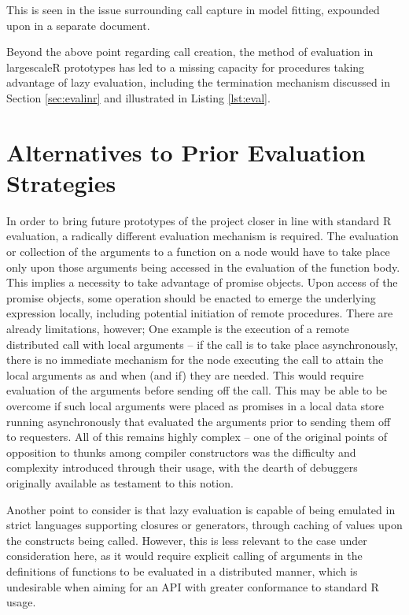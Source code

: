 \documentclass[10pt,a4paper]{article}
\begin{document}
This is seen in the issue surrounding call capture in model fitting, expounded upon in a separate document.

Beyond the above point regarding call creation, the method of evaluation in largescaleR prototypes has led to a missing capacity for procedures taking advantage of lazy evaluation, including the termination mechanism discussed in Section \ref{sec:evalinr} and illustrated in Listing \ref{lst:eval}.

\section{Alternatives to Prior Evaluation Strategies}

In order to bring future prototypes of the project closer in line with standard R evaluation, a radically different evaluation mechanism is required.
The evaluation or collection of the arguments to a function on a node would have to take place only upon those arguments being accessed in the evaluation of the function body.
This implies a necessity to take advantage of promise objects.
Upon access of the promise objects, some operation should be enacted to emerge the underlying expression locally, including potential initiation of remote procedures.
There are already limitations, however;
One example is the execution of a remote distributed call with local arguments -- if the call is to take place asynchronously, there is no immediate mechanism for the node executing the call to attain the local arguments as and when (and if) they are needed.
This would require evaluation of the arguments before sending off the call.
This may be able to be overcome if such local arguments were placed as promises in a local data store running asynchronously that evaluated the arguments prior to sending them off to requesters.
All of this remains highly complex -- one of the original points of opposition to thunks among compiler constructors was the difficulty and complexity introduced through their usage, with the dearth of debuggers originally available as testament to this notion.

Another point to consider is that lazy evaluation is capable of being emulated in strict languages supporting closures or generators, through caching of values upon the constructs being called.
However, this is less relevant to the case under consideration here, as it would require explicit calling of arguments in the definitions of functions to be evaluated in a distributed manner, which is undesirable when aiming for an API with greater conformance to standard R usage.
\end{document}
